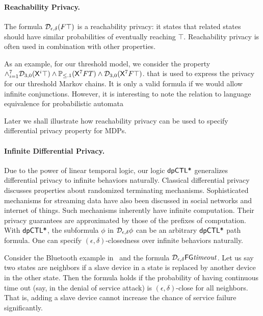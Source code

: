 \paragraph{Reachability Privacy.}
The formula $\mathcal{D}_{{\epsilon}, {\delta}}(F \top)$ is a reachability privacy: it states that related states should have similar probabilities of eventually reaching $\top$. Reachability privacy is often used in combination with other properties.

As an example, for our threshold  model, we consider the property $\wedge_{i=1}^{7} \mathcal{D}_{{3}, {0}}(\mathsf{X}^i \top) \wedge \mathbb{P}_{\le .1}(\mathsf{X}^7 F T) \wedge \mathcal{D}_{{3}, {0}}(\mathsf{X}^7 F \top)$.
that is used to express the privacy for our threshold Markov chains. It is only a valid formula if we would allow infinite conjunctions. However, it is interesting to note the relation to language equivalence for probabilistic automata

Later we shall illustrate how reachability privacy can be used to specify differential privacy property for MDPs.

\paragraph{Infinite Differential Privacy.}
Due to the power of linear temporal logic, our logic $\textsf{dpCTL*}$ generalizes differential privacy to infinite
behaviors naturally. Classical differential privacy discusses properties about
randomized terminating mechanisms. Sophisticated mechanisms for
streaming data have also been discussed in social networks and
internet of things. Such mechanisms inherently have infinite
computation. Their privacy guarantees are approximated by those of the
prefixes of computation.
With $\textsf{dpCTL*}$, the subformula $\phi$ in $\mathcal{D}_{{\epsilon}, {\delta}} \phi$
can be an arbitrary $\textsf{dpCTL*}$ path formula. One can specify
$(\epsilon, \delta)$-closedness over infinite behaviors naturally.

Consider the Bluetooth example in~\cite{DKNP04} and the
formula $\mathcal{D}_{{\epsilon}, {\delta}}{\mathsf{F} \mathsf{G} \mathit{timeout}}$. Let us say
two states are neighbors if a slave device in a state is replaced by
another device in the other state.
Then the formula holds if the probability of having
continuous time out (say, in the denial of service attack) is
$(\epsilon, \delta)$-close for all neighbors. That is, adding a slave
device cannot increase the chance of service failure significantly.

